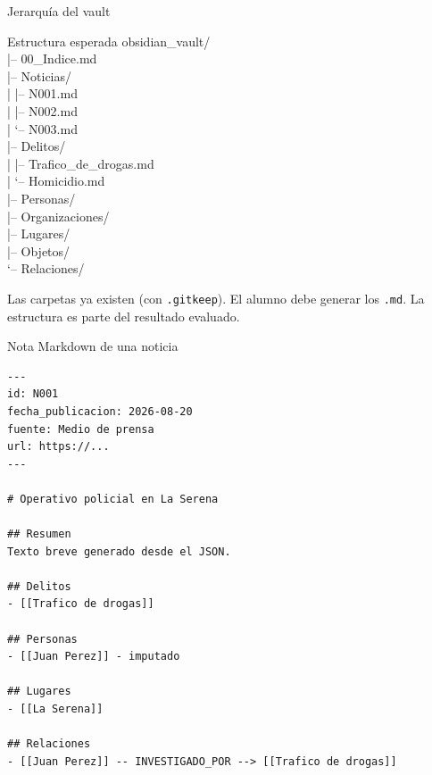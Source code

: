 \documentclass[11pt,aspectratio=169]{beamer}
\newcommand{\code}[1]{\texttt{#1}}
\begin{document}
\begin{frame}[fragile]{Jerarquía del vault}
\footnotesize
\begin{block}{Estructura esperada}
\ttfamily\tiny
obsidian\_vault/\\
|-- 00\_Indice.md\\
|-- Noticias/\\
|   |-- N001.md\\
|   |-- N002.md\\
|   `-- N003.md\\
|-- Delitos/\\
|   |-- Trafico\_de\_drogas.md\\
|   `-- Homicidio.md\\
|-- Personas/\\
|-- Organizaciones/\\
|-- Lugares/\\
|-- Objetos/\\
`-- Relaciones/\\
\end{block}

\scriptsize
Las carpetas ya existen (con \code{.gitkeep}). El alumno debe generar los \code{.md}. La estructura es parte del resultado evaluado.
\end{frame}

\begin{frame}[fragile]{Nota Markdown de una noticia}
\tiny
\begin{lstlisting}
---
id: N001
fecha_publicacion: 2026-08-20
fuente: Medio de prensa
url: https://...
---

# Operativo policial en La Serena

## Resumen
Texto breve generado desde el JSON.

## Delitos
- [[Trafico de drogas]]

## Personas
- [[Juan Perez]] - imputado

## Lugares
- [[La Serena]]

## Relaciones
- [[Juan Perez]] -- INVESTIGADO_POR --> [[Trafico de drogas]]
\end{lstlisting}
\end{frame}
\end{document}
